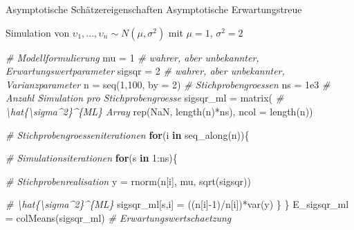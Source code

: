 \documentclass[
  8pt,
  ignorenonframetext,
]{beamer}
\newenvironment{Shaded}{\begin{snugshade}}{\end{snugshade}}
\newcommand{\AttributeTok}[1]{\textcolor[rgb]{0.77,0.63,0.00}{#1}}
\newcommand{\CommentTok}[1]{\textcolor[rgb]{0.56,0.35,0.01}{\textit{#1}}}
\newcommand{\ConstantTok}[1]{\textcolor[rgb]{0.00,0.00,0.00}{#1}}
\newcommand{\ControlFlowTok}[1]{\textcolor[rgb]{0.13,0.29,0.53}{\textbf{#1}}}
\newcommand{\DecValTok}[1]{\textcolor[rgb]{0.00,0.00,0.81}{#1}}
\newcommand{\FloatTok}[1]{\textcolor[rgb]{0.00,0.00,0.81}{#1}}
\newcommand{\FunctionTok}[1]{\textcolor[rgb]{0.00,0.00,0.00}{#1}}
\newcommand{\NormalTok}[1]{#1}
\newcommand{\OtherTok}[1]{\textcolor[rgb]{0.56,0.35,0.01}{#1}}
\newcommand{\SpecialCharTok}[1]{\textcolor[rgb]{0.00,0.00,0.00}{#1}}
\newcommand{\ups} {\upsilon}
\begin{document}
\begin{frame}[fragile]{\small Asymptotische Schätzereigenschaften
\textbar{} Asymptotische Erwartungstreue}
\protect\hypertarget{asymptotische-schuxe4tzereigenschaften-asymptotische-erwartungstreue-2}{}
\small

Simulation von \(\ups_1,...,\ups_n \sim N(\mu,\sigma^2)\) mit
\(\mu = 1\), \(\sigma^2 = 2\)

\footnotesize
{}
\vspace{2mm}

\begin{Shaded}
\begin{Highlighting}[]
\CommentTok{\# Modellformulierung}
\NormalTok{mu        }\OtherTok{=} \DecValTok{1}                       \CommentTok{\# wahrer, aber unbekannter, Erwartungswertparameter}
\NormalTok{sigsqr    }\OtherTok{=} \DecValTok{2}                       \CommentTok{\# wahrer, aber unbekannter, Varianzparameter}
\NormalTok{n         }\OtherTok{=} \FunctionTok{seq}\NormalTok{(}\DecValTok{1}\NormalTok{,}\DecValTok{100}\NormalTok{, }\AttributeTok{by =} \DecValTok{2}\NormalTok{)      }\CommentTok{\# Stichprobengroessen}
\NormalTok{ns        }\OtherTok{=} \FloatTok{1e3}                     \CommentTok{\# Anzahl Simulation pro Stichprobengroesse}
\NormalTok{sigsqr\_ml }\OtherTok{=} \FunctionTok{matrix}\NormalTok{(                 }\CommentTok{\# \textbackslash{}hat\{\textbackslash{}sigma\^{}2\}\^{}\{ML\} Array}
            \FunctionTok{rep}\NormalTok{(}\ConstantTok{NaN}\NormalTok{, }\FunctionTok{length}\NormalTok{(n)}\SpecialCharTok{*}\NormalTok{ns),}
            \AttributeTok{ncol =} \FunctionTok{length}\NormalTok{(n))}

\CommentTok{\# Stichprobengroesseniterationen}
\ControlFlowTok{for}\NormalTok{(i }\ControlFlowTok{in} \FunctionTok{seq\_along}\NormalTok{(n))\{}

    \CommentTok{\# Simulationsiterationen}
    \ControlFlowTok{for}\NormalTok{(s }\ControlFlowTok{in} \DecValTok{1}\SpecialCharTok{:}\NormalTok{ns)\{}

        \CommentTok{\# Stichprobenrealisation}
\NormalTok{        y               }\OtherTok{=} \FunctionTok{rnorm}\NormalTok{(n[i], mu, }\FunctionTok{sqrt}\NormalTok{(sigsqr))}

        \CommentTok{\# \textbackslash{}hat\{\textbackslash{}sigma\^{}2\}\^{}\{ML\}}
\NormalTok{        sigsqr\_ml[s,i]  }\OtherTok{=}\NormalTok{ ((n[i]}\SpecialCharTok{{-}}\DecValTok{1}\NormalTok{)}\SpecialCharTok{/}\NormalTok{n[i])}\SpecialCharTok{*}\FunctionTok{var}\NormalTok{(y)}
\NormalTok{    \}}
\NormalTok{\}}
\NormalTok{E\_sigsqr\_ml }\OtherTok{=} \FunctionTok{colMeans}\NormalTok{(sigsqr\_ml)   }\CommentTok{\# Erwartungswertschaetzung}
\end{Highlighting}
\end{Shaded}
\end{frame}
\end{document}
